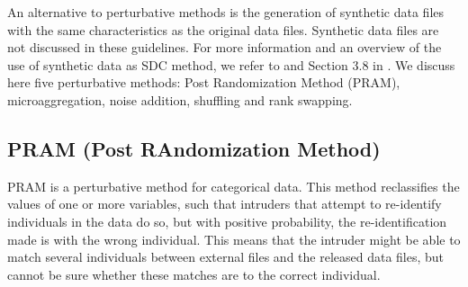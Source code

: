 \documentclass[letterpaper,10pt,english]{sphinxmanual}
\begin{document}
An alternative to perturbative methods is the generation of synthetic
data files with the same characteristics as the original data files.
Synthetic data files are not discussed in these guidelines. For more
information and an overview of the use of synthetic data as SDC method,
we refer to {\hyperref[\detokenize{anon_methods:drec11}]{}} and Section 3.8 in {\hyperref[\detokenize{anon_methods:hdfg12}]{}}.
We discuss here five perturbative methods: Post Randomization Method
(PRAM), microaggregation, noise addition, shuffling and rank swapping.


\subsection{PRAM (Post RAndomization Method)}
\label{\detokenize{anon_methods:pram-post-randomization-method}}
PRAM is a perturbative method for categorical data. This method
reclassifies the values of one or more variables, such that intruders
that attempt to re-identify individuals in the data do so, but with
positive probability, the re-identification made is with the wrong
individual. This means that the intruder might be able to match several
individuals between external files and the released data files, but
cannot be sure whether these matches are to the correct individual.
\end{document}
